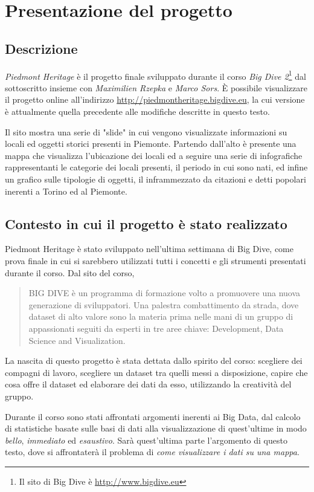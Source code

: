 
\chapter{Presentazione del progetto}

\section{Descrizione}
\emph{Piedmont Heritage} è il progetto finale sviluppato durante il corso \emph{Big Dive 2}\footnote{Il sito di Big Dive è \url{http://www.bigdive.eu}} dal sottoscritto insieme con \emph{Maximilien Rzepka} e \emph{Marco Sors}. \`{E} possibile visualizzare il progetto online all'indirizzo \url{http://piedmontheritage.bigdive.eu}, la cui versione è attualmente quella precedente alle modifiche descritte in questo testo.

Il sito mostra una serie di "slide" in cui vengono visualizzate informazioni su locali ed oggetti storici presenti in Piemonte. Partendo dall'alto è presente una mappa che visualizza l'ubicazione dei locali ed a seguire una serie di infografiche rappresentanti le categorie dei locali presenti, il periodo in cui sono nati, ed infine un grafico sulle tipologie di oggetti, il inframmezzato da citazioni e detti popolari inerenti a Torino ed al Piemonte.

\section{Contesto in cui il progetto è stato realizzato}
Piedmont Heritage è stato sviluppato nell'ultima settimana di Big Dive, come prova finale in cui si sarebbero utilizzati tutti i concetti e gli strumenti presentati durante il corso. Dal sito del corso, \begin{quote}
BIG DIVE è un programma di formazione volto a promuovere una nuova generazione di sviluppatori.
Una palestra combattimento da strada, dove dataset di alto valore sono la materia prima nelle mani di un gruppo di appassionati seguiti da esperti in tre aree chiave: 
Development, Data Science and Visualization.
\end{quote}
La nascita di questo progetto è stata dettata dallo spirito del corso: scegliere dei compagni di lavoro, scegliere un dataset tra quelli messi a disposizione, capire che cosa offre il dataset ed elaborare dei dati da esso, utilizzando la creatività del gruppo.

Durante il corso sono stati affrontati argomenti inerenti ai Big Data, dal calcolo di statistiche basate sulle basi di dati alla visualizzazione di quest'ultime in modo \emph{bello}, \emph{immediato} ed \emph{esaustivo}. Sarà quest'ultima parte l'argomento di questo testo, dove si affrontaterà il problema di \emph{come visualizzare i dati su una mappa}.

